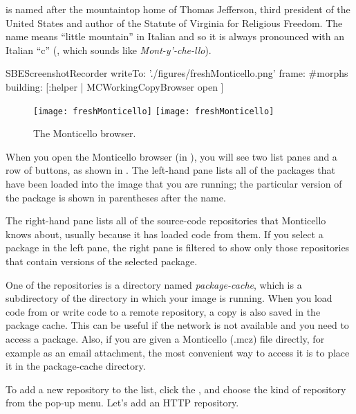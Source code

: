 \documentclass[a4paper,10pt,twoside]{book}
\begin{document}
 is named after the mountaintop home of Thomas Jefferson, third president of the United States and author of the Statute of Virginia for Religious Freedom.
The name means ``little mountain'' in Italian and so it is always pronounced with an Italian ``c'' (, which sounds like \emph{Mont-y'-che-llo}).

\begin{ExecuteSmalltalkScript}
SBEScreenshotRecorder writeTo: './figures/freshMonticello.png' frame: #morphs building: [:helper |
  MCWorkingCopyBrowser open
]
\end{ExecuteSmalltalkScript}
\begin{figure}[btp]
	\begin{center}
	\ifluluelse
		{\texttt{[image: freshMonticello]}}
		{\texttt{[image: freshMonticello]}}
	\end{center}
	\caption{The Monticello browser.}
	\label{fig:freshMonticello}
\end{figure}

When you open the Monticello browser (\eg in  ), you will see two list panes and a row of buttons, as shown in .
The left-hand pane lists all of the packages that have been loaded into the image that you are running; the particular version of the package is shown in parentheses after the name.

The right-hand pane lists all of the source-code repositories that Monticello knows about, usually because it has loaded code from them.  If you select a package in the left pane, the right pane is filtered to show only those repositories that contain versions of the selected package.

One of the repositories is a directory named \emph{package-cache}, which is a subdirectory of the directory in which your image is running.
When you load code from or write code to a remote repository, a copy is also saved in the package cache.
This can be useful if the network is not available and you need to access a package.
Also, if you are given a Monticello (.mcz) file directly, for example as an email attachment, the most convenient way to access it is to place it in the package-cache directory.

To add a new repository to the list, click the , and choose the kind of repository from the pop-up menu.
Let's add an HTTP repository.
\end{document}
